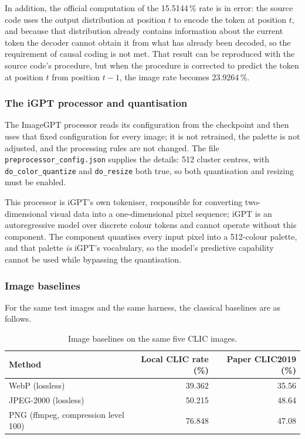 \documentclass[12pt,a4paper]{article}
\begin{document}
In addition, the official computation of the 15.5144\,\% rate is in error: the source code uses
the output distribution at position $t$ to encode the token at position $t$, and because that
distribution already contains information about the current token the decoder cannot obtain it
from what has already been decoded, so the requirement of causal coding is not met. That result
can be reproduced with the source code's procedure, but when the procedure is corrected to
predict the token at position $t$ from position $t-1$, the image rate becomes 23.9264\,\%.

\subsubsection{The iGPT processor and quantisation}

The ImageGPT processor reads its configuration from the checkpoint and then uses that fixed
configuration for every image; it is not retrained, the palette is not adjusted, and the
processing rules are not changed. The file \texttt{preprocessor\_config.json} supplies the
details: 512 cluster centres, with \texttt{do\_color\_quantize} and \texttt{do\_resize} both
true, so both quantisation and resizing must be enabled.

This processor is iGPT's own tokeniser, responsible for converting two-dimensional visual data
into a one-dimensional pixel sequence; iGPT is an autoregressive model over discrete colour
tokens and cannot operate without this component. The component quantises every input pixel
into a 512-colour palette, and that palette \emph{is} iGPT's vocabulary, so the model's
predictive capability cannot be used while bypassing the quantisation.

\subsubsection{Image baselines}

For the same test images and the same harness, the classical baselines are as follows.

\begin{table}[htbp]\centering\small
\caption{Image baselines on the same five CLIC images.}
\begin{tabular}{@{}lrr@{}}
\toprule
Method & Local CLIC rate (\%) & Paper CLIC2019 (\%) \\
\midrule
WebP (lossless) & 39.362 & 35.56 \\
JPEG-2000 (lossless) & 50.215 & 48.64 \\
PNG (ffmpeg, compression level 100) & 76.848 & 47.08 \\
\bottomrule
\end{tabular}
\end{table}
\end{document}

